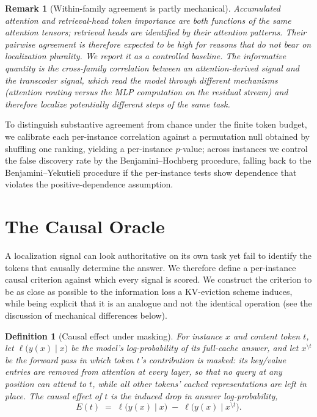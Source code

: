 \documentclass[11pt]{article}
\newtheorem{definition}{Definition}
\newtheorem{remark}{Remark}
\begin{document}
\begin{remark}[Within-family agreement is partly mechanical]
Accumulated attention and retrieval-head token importance are both
functions of the same attention tensors; retrieval heads are identified by
their attention patterns. Their pairwise agreement is therefore expected to
be high for reasons that do not bear on localization plurality. We report it
as a controlled baseline. The informative quantity is the cross-family
correlation between an attention-derived signal and the transcoder signal,
which read the model through different mechanisms (attention routing versus
the MLP computation on the residual stream) and therefore localize
potentially different steps of the same task.
\end{remark}

To distinguish substantive agreement from chance under the finite token
budget, we calibrate each per-instance correlation against a permutation
null obtained by shuffling one ranking, yielding a per-instance $p$-value;
across instances we control the false discovery rate by the
Benjamini--Hochberg procedure, falling back to the Benjamini--Yekutieli
procedure if the per-instance tests show dependence that violates the
positive-dependence assumption.

\section{The Causal Oracle}
\label{sec:oracle}

A localization signal can look authoritative on its own task yet fail to
identify the tokens that causally determine the answer. We therefore define
a per-instance causal criterion against which every signal is scored. We
construct the criterion to be as close as possible to the information loss a
KV-eviction scheme induces, while being explicit that it is an analogue and
not the identical operation (see the discussion of mechanical differences
below).

\begin{definition}[Causal effect under masking]
\label{def:oracle}
For instance $x$ and content token $t$, let $\ell\bigl(y(x) \mid x\bigr)$ be
the model's log-probability of its full-cache answer, and let $x^{\setminus t}$
be the forward pass in which token $t$'s contribution is \emph{masked}: its
key/value entries are removed from attention at every layer, so that no query
at any position can attend to $t$, while all other tokens' cached
representations are left in place. The causal effect of $t$ is the induced
drop in answer log-probability,
\[
  E(t)
  \;=\;
  \ell\bigl(y(x) \mid x\bigr)
  \;-\;
  \ell\bigl(y(x) \mid x^{\setminus t}\bigr).
\]
\end{definition}
\end{document}
